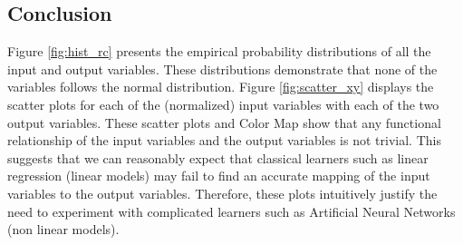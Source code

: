   \subsection{Conclusion}
  Figure \ref{fig:hist_rc} presents the empirical probability distributions of all the input and output variables. These distributions demonstrate that none of the variables follows the normal distribution. Figure \ref{fig:scatter_xy} displays the scatter plots for each of the (normalized) input variables with each of the two output variables. These scatter plots and Color Map show that any functional relationship of the input variables and the output variables is not trivial. This suggests that we can reasonably expect that classical learners such as linear regression (linear models) may fail to find an accurate mapping of the input variables to the output variables. Therefore, these plots intuitively justify the need to experiment with complicated learners such as Artificial Neural Networks (non linear models).
